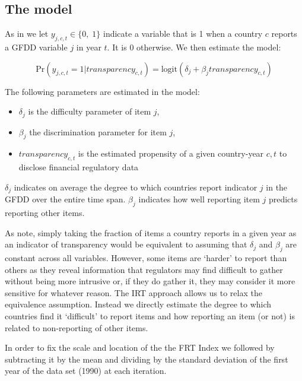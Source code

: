 \documentclass[a4paper]{article}
\begin{document}
\subsection{The model}

As in \cite{Hollyer2014} we let $y_{j,c,t} \in \{0,\; 1\}$ indicate a variable that is 1 when a country $c$ reports a GFDD variable $j$ in year $t$. It is 0 otherwise. We then estimate the model:

\begin{equation}
    \mathrm{Pr}(y_{j,c,t} = 1|transparency_{c,t}) = \mathrm{logit}(\delta_{j} + \beta_{j}transparency_{c,t})
\end{equation}

\noindent The following parameters are estimated in the model:

\begin{itemize}
    \item $\delta_{j}$ is the difficulty parameter of item $j$,
    \item $\beta_{j}$ the discrimination parameter for item $j$,
    \item $transparency_{c,t}$ is the estimated propensity of a given country-year $c,t$ to disclose financial regulatory data
\end{itemize}

\noindent $\delta_{j}$ indicates on average the degree to which countries report indicator $j$ in the GFDD over the entire time span. $\beta_{j}$ indicates how well reporting item $j$ predicts reporting other items.

As \cite{Hollyer2014} note, simply taking the fraction of items a country reports in a given year as an indicator of transparency would be equivalent to assuming that $\delta_{j}$ and $\beta_{j}$ are constant across all variables. However, some items are `harder' to report than others as they reveal information that regulators may find difficult to gather without being more intrusive or, if they do gather it, they may consider it more sensitive for whatever reason. The IRT approach allows us to relax the equivalence assumption. Instead we directly estimate the degree to which countries find it `difficult' to report items and how reporting an item (or not) is related to non-reporting of other items.

In order to fix the scale and location of the the FRT Index we followed \cite{Hollyer2014} by subtracting it by the mean and dividing by the standard deviation of the first year of the data set (1990) at each iteration.
\end{document}
